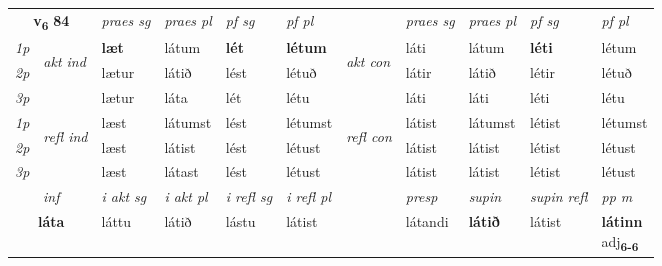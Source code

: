 \noindent
\begin{tabular}{lllllllllll} \toprule
\multicolumn{2}{c}{\textbf{v{\textsubscript{6}}} \Large{\textbf{84}}}  &  \textit{praes sg}  & \textit{praes pl}  &\textit{ pf sg} & \textit{pf pl} &  &  \textit{praes sg}  & \textit{praes pl}  & \textit{pf sg} & \textit{pf pl } \\*
	\cmidrule{3-6} \cmidrule{8-11}
 {\textit{1p}} & \multirow{3}{*}{\begin{turn}{90}\textit{akt ind}\end{turn}} & \textbf{læt} & látum & \textbf{lét} & \textbf{létum} & \multirow{3}{*}{\begin{turn}{90}\textit{akt con}\end{turn}} &láti & látum & \textbf{léti} & létum\\*
 {\textit{2p}} &  &  lætur  & látið & lést & létuð & & látir & látið & létir & létuð \\*
{\textit{3p}} &  & lætur & láta & lét & létu & & láti & láti& léti & létu \\*
\cmidrule{3-6} \cmidrule{8-11}
 {\textit{1p}} & \multirow{3}{*}{\begin{turn}{90}\textit{refl ind}\end{turn}}  & læst & látumst & lést & létumst & \multirow{3}{*}{\begin{turn}{90}\textit{refl con}\end{turn}}  &látist & látumst & létist & létumst \\*
 {\textit{2p}} &  & læst & látist & lést & létust & &látist & látist & létist & létust \\*
 {\textit{3p}}  & & læst & látast & lést & létust & & látist & látist& létist & létust \\*
\cmidrule{3-6} \cmidrule{8-11}

   \multicolumn{2}{c}{\textit{inf}}  & \textit{i akt sg} & \textit{i akt pl} & \textit{i refl sg} & \textit{i refl pl} && \textit{presp} & \textit{supin} & \textit{supin refl} & \textit{pp m} \\*
  \multicolumn{2}{c}{\textbf{láta}} & láttu  & látið & lástu & látist && látandi &  \textbf{látið} & látist & \specialcell{\textbf{látinn} \\ adj\textbf{\textsubscript{6-6}}} \\*
\end{tabular}

